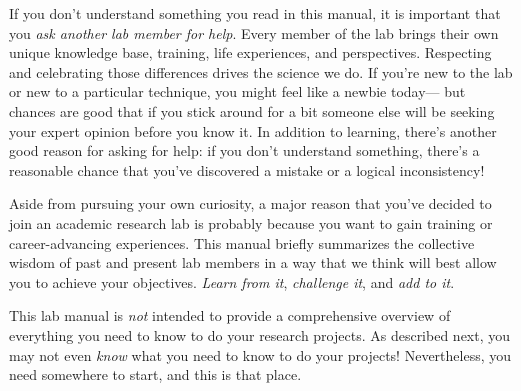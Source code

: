 \documentclass{tufte-book} %
\begin{document}
If you don't understand something you read in this
manual, it is important that you \textit{ask another lab member for
  help}.  Every member of the lab brings their own unique knowledge
base, training, life experiences, and perspectives.  Respecting and
celebrating those differences drives the science we do.  If you're new
to the lab or new to a particular technique, you might feel like a
newbie today--- but chances are good that if you stick around for a
bit someone else will be seeking your expert opinion before you know
it.  In addition to learning, there's another good reason for asking
for help: if you don't understand something, there's a reasonable
chance that you've discovered a mistake or a logical inconsistency!

Aside from pursuing your own curiosity, a major reason that you've
decided to join an academic research lab is probably because you want
to gain training or career-advancing experiences.  This manual briefly
summarizes the collective wisdom of past and present lab members in a
way that we think will best allow you to achieve your objectives.
\textit{Learn from it}, \textit{challenge it}, and \textit{add to it}.

This lab manual is
\textit{not} intended to provide a comprehensive overview of
everything you need to know to do your research projects.  As
described next, you may not even \textit{know} what you need to know
to do your projects!  Nevertheless, you need somewhere to start, and
this is that place.
\end{document}
